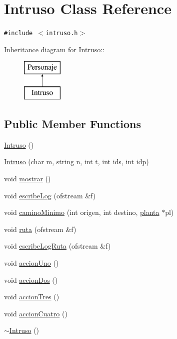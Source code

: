 \hypertarget{classIntruso}{
\section{Intruso Class Reference}
\label{classIntruso}
}
{\tt \#include $<$intruso.h$>$}

Inheritance diagram for Intruso::\begin{figure}[H]
\begin{center}
\leavevmode
\includegraphics[height=2cm]{classIntruso}
\end{center}
\end{figure}
\subsection*{Public Member Functions}
\begin{CompactItemize}
\item 
\hyperlink{classIntruso_f36bc9ec8ef7b46e9335c6842908a527}{Intruso} ()
\item 
\hyperlink{classIntruso_c8f76c5d9e67549e75cb816820867e7f}{Intruso} (char m, string n, int t, int ids, int idp)
\item 
void \hyperlink{classIntruso_06a5d236e669e5add8b1c6472303133e}{mostrar} ()
\item 
void \hyperlink{classIntruso_979c89c596d92d8ce69b8af5e556d62d}{escribeLog} (ofstream \&f)
\item 
void \hyperlink{classIntruso_6d239cda2dc32af27e50ba84524e4179}{caminoMinimo} (int origen, int destino, \hyperlink{classplanta}{planta} $\ast$pl)
\item 
void \hyperlink{classIntruso_2898ae82386e99d361f6f131122b7be1}{ruta} (ofstream \&f)
\item 
void \hyperlink{classIntruso_0f0142b1852ed9f0431af335d3ff6f14}{escribeLogRuta} (ofstream \&f)
\item 
void \hyperlink{classIntruso_dee71b00225e294086d8980625a32ab3}{accionUno} ()
\item 
void \hyperlink{classIntruso_6fef0ae823fdabc05796413f53d073e5}{accionDos} ()
\item 
void \hyperlink{classIntruso_52e521cc66983d5a9f20f3424818e6e4}{accionTres} ()
\item 
void \hyperlink{classIntruso_99e215b1df4387b629f25349378d3bbb}{accionCuatro} ()
\item 
\hyperlink{classIntruso_947673866dbb60c76b40eff5ab139bcd}{$\sim$Intruso} ()
\end{CompactItemize}


